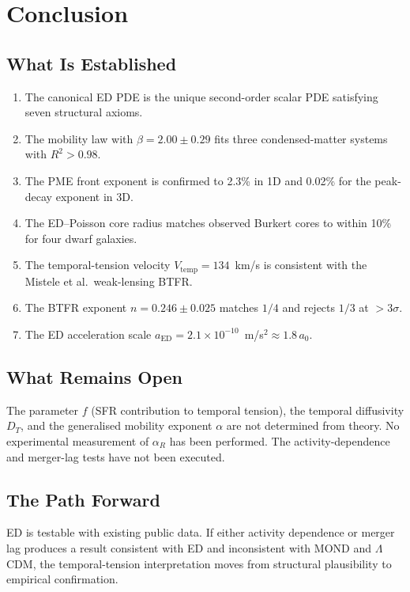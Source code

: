 \documentclass[12pt,letterpaper]{article}
\begin{document}
\section{Conclusion}

\subsection{What Is Established}

\begin{enumerate}[leftmargin=2em]
\item The canonical ED PDE is the unique second-order scalar PDE satisfying seven structural axioms.
\item The mobility law with $\beta = 2.00 \pm 0.29$ fits three condensed-matter systems with $R^2 > 0.98$.
\item The PME front exponent is confirmed to 2.3\% in 1D and 0.02\% for the peak-decay exponent in 3D.
\item The ED--Poisson core radius matches observed Burkert cores to within 10\% for four dwarf galaxies.
\item The temporal-tension velocity $V_{\mathrm{temp}} = 134$~km/s is consistent with the Mistele et al.\ weak-lensing BTFR.
\item The BTFR exponent $n = 0.246 \pm 0.025$ matches $1/4$ and rejects $1/3$ at $> 3\sigma$.
\item The ED acceleration scale $a_{\mathrm{ED}} = 2.1 \times 10^{-10}$~m/s$^2 \approx 1.8\,a_0$.
\end{enumerate}

\subsection{What Remains Open}

The parameter $f$ (SFR contribution to temporal tension), the temporal diffusivity $D_T$, and the generalised mobility exponent $\alpha$ are not determined from theory. No experimental measurement of $\alpha_R$ has been performed. The activity-dependence and merger-lag tests have not been executed.

\subsection{The Path Forward}

ED is testable with existing public data. If either activity dependence or merger lag produces a result consistent with ED and inconsistent with MOND and $\Lambda$CDM, the temporal-tension interpretation moves from structural plausibility to empirical confirmation.
\end{document}
